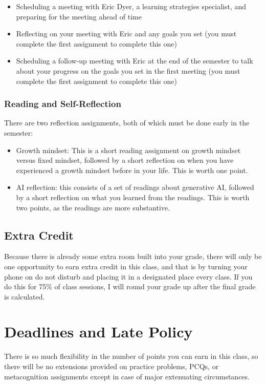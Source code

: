 \documentclass[
  letterpaper,
  DIV=11,
  numbers=noendperiod]{scrartcl}
\providecommand{\tightlist}{%
  \setlength{\itemsep}{0pt}\setlength{\parskip}{0pt}}
\begin{document}
\begin{itemize}
\tightlist
\item
  Scheduling a meeting with Eric Dyer, a learning strategies specialist,
  and preparing for the meeting ahead of time
\item
  Reflecting on your meeting with Eric and any goals you set (you must
  complete the first assignment to complete this one)
\item
  Scheduling a follow-up meeting with Eric at the end of the semester to
  talk about your progress on the goals you set in the first meeting
  (you must complete the first assignment to complete this one)
\end{itemize}

\subsubsection{Reading and Self-Reflection}

There are two reflection assignments, both of which must be done early
in the semester:

\begin{itemize}
\tightlist
\item
  Growth mindset: This is a short reading assignment on growth mindset
  versus fixed mindset, followed by a short reflection on when you have
  experienced a growth mindset before in your life. This is worth one
  point.
\item
  AI reflection: this consists of a set of readings about generative AI,
  followed by a short reflection on what you learned from the readings.
  This is worth two points, as the readings are more substantive.
\end{itemize}

\subsection{Extra Credit}\label{roundup}

Because there is already some extra room built into your grade, there
will only be one opportunity to earn extra credit in this class, and
that is by turning your phone on do not disturb and placing it in a
designated place every class. If you do this for 75\% of class sessions,
I will round your grade up after the final grade is calculated.

\section{Deadlines and Late Policy}\label{deadlines}

There is so much flexibility in the number of points you can earn in
this class, so there will be no extensions provided on practice
problems, PCQs, or metacognition assignments except in case of major
extenuating circumstances.
\end{document}

